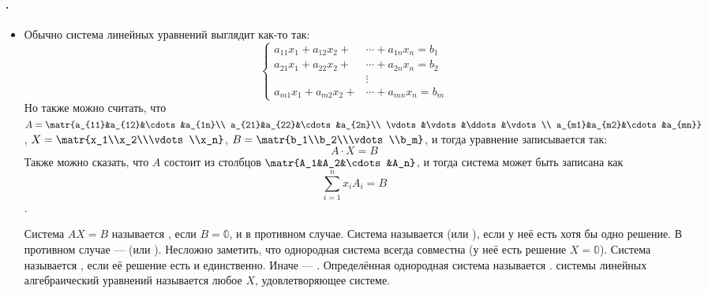 \documentclass{article}
\begin{document}
    \paragraph{.}
    \begin{itemize}
        \item[]
        \begin{Comment}
            Обычно система линейных уравнений выглядит как-то так:
            \[\left\{\begin{aligned}
                a_{11}x_1+a_{12}x_2+&\cdots+a_{1n}x_n=b_1\\
                a_{21}x_1+a_{22}x_2+&\cdots+a_{2n}x_n=b_2\\
                &\vdots\\
                a_{m1}x_1+a_{m2}x_2+&\cdots+a_{mn}x_n=b_m
            \end{aligned}\right.\]
            Но также можно считать, что $A=\matr{a_{11}&a_{12}&\cdots&a_{1n}\\
            a_{21}&a_{22}&\cdots&a_{2n}\\
            \vdots&\vdots&\ddots&\vdots\\
            a_{m1}&a_{m2}&\cdots&a_{mn}}$, $X=\matr{x_1\\x_2\\\vdots\\x_n}$, $B=\matr{b_1\\b_2\\\vdots\\b_m}$, и тогда уравнение записывается так: \[A\cdot X=B\]
            Также можно сказать, что $A$ состоит из столбцов $\matr{A_1&A_2&\cdots&A_n}$, и тогда система может быть записана как
            \[\sum\limits_{i=1}^nx_iA_i=B\].
        \end{Comment}
        \dfn Система $AX=B$ называется , если $B=\mathbb0$, и  в противном случае.
        \dfn Система называется  (или ), если у неё есть хотя бы одно решение. В противном случае ---  (или ).
        \thm Несложно заметить, что однородная система всегда совместна (у неё есть решение $X=\mathbb0$).
        \dfn Система называется , если её решение есть и единственно. Иначе --- .
        \dfn Определённая однородная система называется .
        \dfn {} системы линейных алгебраический уравнений называется любое $X$, удовлетворяющее системе.

\end{itemize}
\end{document}
